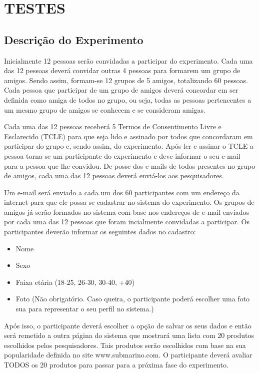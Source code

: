 \chapter{TESTES} %
\label{cha:testes} %

\section{Descrição do Experimento}
\label{cha:descricao_do_experimento}

 Inicialmente 12 pessoas serão convidadas a participar do experimento. Cada uma das 12 pessoas deverá convidar outras 4 pessoas para formarem um grupo de amigos. Sendo assim, formam-se 12 grupos de 5 amigos, totalizando 60 pessoas. Cada pessoa que participar de um grupo de amigos deverá concordar em ser definida como amiga de todos no grupo, ou seja, todas as pessoas pertencentes a um mesmo grupo de amigos se conhecem e se consideram amigas.

 Cada uma das 12 pessoas receberá 5 Termos de Consentimento Livre e Esclarecido (TCLE) para que seja lido e assinado por todos que concordaram em participar do grupo e, sendo assim, do experimento. Após ler e assinar o TCLE a pessoa torna-se um participante do experimento e deve informar o seu e-mail para a pessoa que lhe convidou. De posse dos e-mails de todos presentes no grupo de amigos, cada uma das 12 pessoas deverá enviá-los aos pesquisadores.

 Um e-mail será enviado a cada um dos 60 participantes com um endereço da internet para que ele possa se cadastrar no sistema do experimento. Os grupos de amigos já serão formados no sistema com base nos endereços de e-mail enviados por cada uma das 12 pessoas que foram incialmente convidadas a participar. Os participantes deverão informar os seguintes dados no cadastro:

\begin{itemize}
	\item Nome
	\item Sexo
	\item Faixa etária (18-25, 26-30, 30-40, +40)
	\item Foto (Não obrigatório. Caso queira, o participante poderá escolher uma foto sua para representar o seu perfil no sistema.)
\end{itemize}

 Após isso, o participante deverá escolher a opção de salvar os seus dados e então será remetido a outra página do sistema que mostrará uma lista com 20 produtos escolhidos pelos pesquisadores. Tais produtos serão escolhidos com base na sua popularidade definida no site www.submarino.com. O participante deverá avaliar TODOS os 20 produtos para passar para a próxima fase do experimento.


